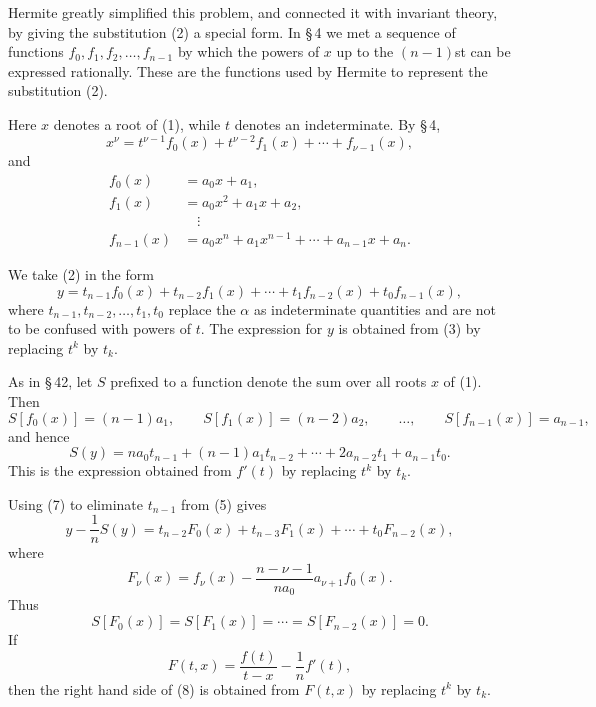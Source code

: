 \documentclass[11pt]{article}
\begin{document}
Hermite greatly simplified this problem, and connected it with invariant theory, by giving the substitution (2) a special form. In \S\,4 we met a sequence of functions $f_0,f_1,f_2,\ldots,f_{n-1}$ by which the powers of $x$ up to the $(n-1)$st can be expressed rationally. These are the functions used by Hermite to represent the substitution (2).

Here $x$ denotes a root of (1), while $t$ denotes an indeterminate. By \S\,4,
\begin{equation}
 x^\nu=t^{\nu-1}f_0(x)+t^{\nu-2}f_1(x)+\cdots+f_{\nu-1}(x),
\tag{3}
\end{equation}
and
\begin{equation}
\begin{aligned}
 f_0(x)&=a_0x+a_1,\\
 f_1(x)&=a_0x^2+a_1x+a_2,\\
 &\quad\vdots\\
 f_{n-1}(x)&=a_0x^n+a_1x^{n-1}+\cdots+a_{n-1}x+a_n.
\end{aligned}
\tag{4}
\end{equation}

We take (2) in the form
\begin{equation}
 y=t_{n-1}f_0(x)+t_{n-2}f_1(x)+\cdots+t_1f_{n-2}(x)+t_0f_{n-1}(x),
\tag{5}
\end{equation}
where $t_{n-1},t_{n-2},\ldots,t_1,t_0$ replace the $\alpha$ as indeterminate quantities and are not to be confused with powers of $t$. The expression for $y$ is obtained from (3) by replacing $t^k$ by $t_k$.

As in \S\,42, let $S$ prefixed to a function denote the sum over all roots $x$ of (1). Then
\begin{equation}
 S[f_0(x)]=(n-1)a_1,
 \qquad
 S[f_1(x)]=(n-2)a_2,
 \qquad\ldots,
 \qquad
 S[f_{n-1}(x)]=a_{n-1},
\tag{6}
\end{equation}
and hence
\begin{equation}
 S(y)=na_0t_{n-1}+(n-1)a_1t_{n-2}+\cdots+2a_{n-2}t_1+a_{n-1}t_0.
\tag{7}
\end{equation}
This is the expression obtained from $f'(t)$ by replacing $t^k$ by $t_k$.

Using (7) to eliminate $t_{n-1}$ from (5) gives
\begin{equation}
 y-\frac1nS(y)=t_{n-2}F_0(x)+t_{n-3}F_1(x)+\cdots+t_0F_{n-2}(x),
\tag{8}
\end{equation}
where
\begin{equation}
 F_\nu(x)=f_\nu(x)-\frac{n-\nu-1}{n a_0}a_{\nu+1}f_0(x).
\tag{9}
\end{equation}
Thus
\begin{equation}
 S[F_0(x)]=S[F_1(x)]=\cdots=S[F_{n-2}(x)]=0.
\tag{10}
\end{equation}
If
\begin{equation}
 F(t,x)=\frac{f(t)}{t-x}-\frac1n f'(t),
\tag{11}
\end{equation}
then the right hand side of (8) is obtained from $F(t,x)$ by replacing $t^k$ by $t_k$.
\end{document}
